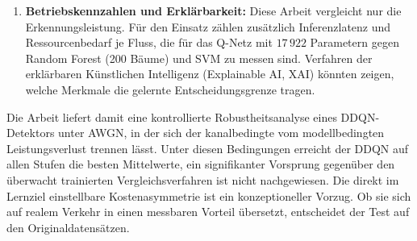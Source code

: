 \begin{enumerate}
    \item \textbf{Betriebskennzahlen und Erklärbarkeit:} Diese Arbeit vergleicht nur die Erkennungsleistung. Für den Einsatz zählen zusätzlich Inferenzlatenz und Ressourcenbedarf je Fluss, die für das Q-Netz mit $17\,922$ Parametern gegen Random Forest (200 Bäume) und SVM zu messen sind. Verfahren der erklärbaren Künstlichen Intelligenz (Explainable AI, XAI) könnten zeigen, welche Merkmale die gelernte Entscheidungsgrenze tragen.
\end{enumerate}

Die Arbeit liefert damit eine kontrollierte Robustheitsanalyse eines DDQN-Detektors unter AWGN, in der sich der kanalbedingte vom modellbedingten Leistungsverlust trennen lässt. Unter diesen Bedingungen erreicht der DDQN auf allen Stufen die besten Mittelwerte, ein signifikanter Vorsprung gegenüber den überwacht trainierten Vergleichsverfahren ist nicht nachgewiesen. Die direkt im Lernziel einstellbare Kostenasymmetrie ist ein konzeptioneller Vorzug. Ob sie sich auf realem Verkehr in einen messbaren Vorteil übersetzt, entscheidet der Test auf den Originaldatensätzen.